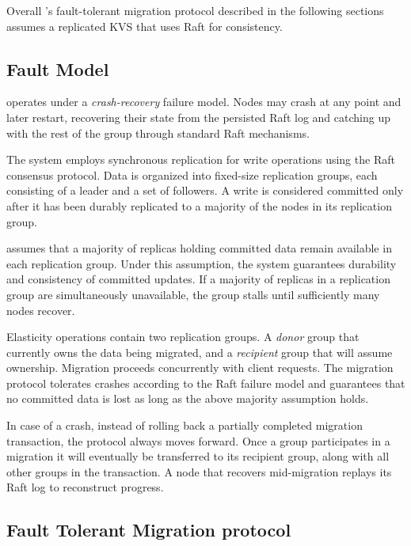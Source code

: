 Overall \OurImplementation{}'s fault-tolerant migration protocol described in the following sections assumes a replicated KVS that uses Raft for consistency.


\subsection{Fault Model}
\label{sec:fault-model}
\OurImplementation{} operates under a \emph{crash-recovery} failure model.
Nodes may crash at any point and later restart, recovering their state from the persisted Raft log and catching up with the rest of the group through standard Raft mechanisms.

The system employs synchronous replication for write operations using the Raft consensus protocol.
Data is organized into fixed-size replication groups, each consisting of a leader and a set of followers.
A write is considered committed only after it has been durably replicated to a majority of the nodes in its replication group.

\OurImplementation{} assumes that a majority of replicas holding committed data remain available in each replication group.
Under this assumption, the system guarantees durability and consistency of committed updates.
If a majority of replicas in a replication group are simultaneously unavailable, the group stalls until sufficiently many nodes recover.

Elasticity operations contain two replication groups. A \emph{donor} group that currently owns the data being migrated, and a \emph{recipient} group that will assume ownership.
Migration proceeds concurrently with client requests.
The migration protocol tolerates crashes according to the Raft failure model and guarantees that no committed data is lost as long as the above majority assumption holds.

In case of a crash, instead of rolling back a partially completed migration transaction, the protocol always moves forward. Once a group participates in a migration it will eventually be transferred to its recipient group, along with all other groups in the transaction.
A node that recovers mid-migration replays its Raft log to reconstruct progress. 


\subsection{Fault Tolerant Migration protocol}
\label{sec:migration-protocol}

